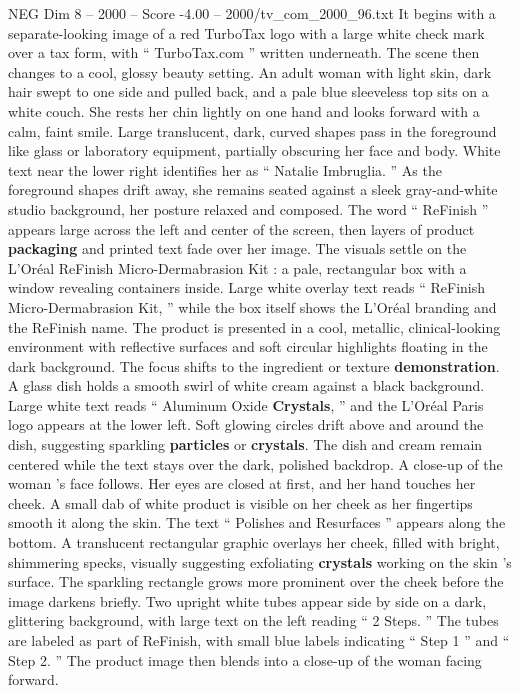 \begin{textsample}{NEG Dim 8 – 2000 – Score -4.00 – 2000/tv\_com\_2000\_96.txt}  \label{ex:f8_neg_081}
It begins with a separate-looking image of a red TurboTax logo with a large white check mark over a tax form, with “ TurboTax.com ” written underneath.
The scene then changes to a cool, glossy beauty setting.
An adult woman with light skin, dark hair swept to one side and pulled back, and a pale blue sleeveless top sits on a white couch.
She rests her chin lightly on one hand and looks forward with a calm, faint smile.
Large translucent, dark, curved shapes pass in the foreground like glass or laboratory equipment, partially obscuring her face and body.
White text near the lower right identifies her as “ Natalie Imbruglia. ” As the foreground shapes drift away, she remains seated against a sleek gray-and-white studio background, her posture relaxed and composed.
The word “ ReFinish ” appears large across the left and center of the screen, then layers of product \textbf{packaging} and printed text fade over her image.
The visuals settle on the L’Oréal ReFinish Micro-Dermabrasion Kit : a pale, rectangular box with a window revealing containers inside.
Large white overlay text reads “ ReFinish Micro-Dermabrasion Kit, ” while the box itself shows the L’Oréal branding and the ReFinish name.
The product is presented in a cool, metallic, clinical-looking environment with reflective surfaces and soft circular highlights floating in the dark background.
The focus shifts to the ingredient or texture \textbf{demonstration}.
A glass dish holds a smooth swirl of white cream against a black background.
Large white text reads “ Aluminum Oxide \textbf{Crystals}, ” and the L’Oréal Paris logo appears at the lower left.
Soft glowing circles drift above and around the dish, suggesting sparkling \textbf{particles} or \textbf{crystals}.
The dish and cream remain centered while the text stays over the dark, polished backdrop.
A close-up of the woman ’s face follows.
Her eyes are closed at first, and her hand touches her cheek.
A small dab of white product is visible on her cheek as her fingertips smooth it along the skin.
The text “ Polishes and Resurfaces ” appears along the bottom.
A translucent rectangular graphic overlays her cheek, filled with bright, shimmering specks, visually suggesting exfoliating \textbf{crystals} working on the skin ’s surface.
The sparkling rectangle grows more prominent over the cheek before the image darkens briefly.
Two upright white tubes appear side by side on a dark, glittering background, with large text on the left reading “ 2 Steps. ” The tubes are labeled as part of ReFinish, with small blue labels indicating “ Step 1 ” and “ Step 2. ” The product image then blends into a close-up of the woman facing forward.

\end{textsample}
